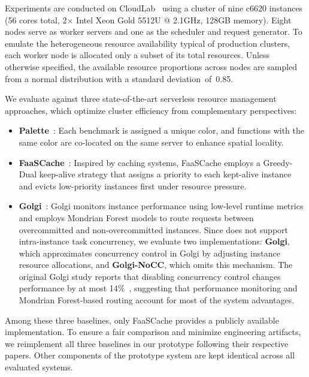  Experiments are conducted on CloudLab~\cite{cloudlab} 
using a cluster of nine c6620 instances (56 cores total, 2$\times$ Intel Xeon 
Gold 5512U @ 2.1GHz, 128GB memory). Eight nodes serve as worker servers and one 
as the scheduler and request generator. To emulate the heterogeneous resource 
availability typical of production clusters, each worker node is allocated only 
a subset of its total resources. Unless otherwise specified, the available resource 
proportions across nodes are sampled from a normal distribution with a standard 
deviation~of~0.85.

 We evaluate \sysname against three state-of-the-art  serverless resource
management approaches, which optimize cluster efficiency
from complementary perspectives:
\begin{itemize}
    \item \textbf{Palette}~\cite{abdi2023palette}: Each benchmark is assigned a
    unique color, and functions with the same color are co-located on the same
    server to enhance spatial locality.

    \item \textbf{FaaSCache}~\cite{FaaSCache}: Inspired by caching systems,
    FaaSCache employs a Greedy-Dual keep-alive strategy that assigns a priority
    to each kept-alive instance and evicts low-priority instances first under
    resource pressure.

    \item \textbf{Golgi}~\cite{soccGolgi}: Golgi monitors instance performance
    using low-level runtime metrics and employs Mondrian Forest models to
    route requests between overcommitted and non-overcommitted instances. Since
    \sysname does not support intra-instance task concurrency, we
    evaluate two implementations: \textbf{Golgi}, which approximates concurrency
    control in Golgi by adjusting instance resource allocations, and \textbf{Golgi-NoCC},
    which omits this mechanism. The original Golgi study reports that disabling
    concurrency control changes performance by at most 14\%~\cite{soccGolgi},
    suggesting that performance monitoring and Mondrian Forest-based routing
    account for most of the system advantages.
\end{itemize}

Among these three baselines, only FaaSCache provides a publicly available
implementation. To ensure a fair comparison and minimize engineering artifacts,
we reimplement all three baselines in our prototype following their respective
papers. Other components of the prototype system are kept identical across all
evaluated systems.

